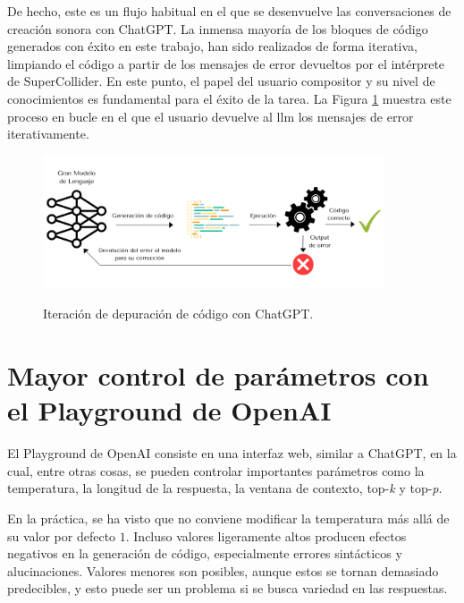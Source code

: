 De hecho, este es un flujo habitual en el que se desenvuelve las conversaciones de creación sonora con ChatGPT. La inmensa mayoría de los bloques de código generados con éxito en este trabajo, han sido realizados de forma iterativa, limpiando el código a partir de los mensajes de error devueltos por el intérprete de SuperCollider. En este punto, el papel del usuario compositor y su nivel de conocimientos es fundamental para el éxito de la tarea. La Figura \ref{fig:iteracion_depuracion} muestra este proceso en bucle en el que el usuario devuelve al \gls{llm} los mensajes de error iterativamente.

\begin{figure}[H]
    \caption[Iteración de depuración de código con ChatGPT]{Iteración de depuración de código con ChatGPT.}
    \centering
    \includegraphics[width=0.9\textwidth]{./figuras/iteracion_depuracion_codigo.png}
    \source{\propio}
    \label{fig:iteracion_depuracion}
\end{figure}

\section{Mayor control de parámetros con el Playground de OpenAI}

El Playground de OpenAI consiste en una interfaz web, similar a ChatGPT, en la cual, entre otras cosas, se pueden controlar importantes parámetros como la temperatura, la longitud de la respuesta, la ventana de contexto, top-\emph{k} y top-\emph{p}. 

En la práctica, se ha visto que no conviene modificar la temperatura más allá de su valor por defecto $1$. Incluso valores ligeramente altos producen efectos negativos en la generación de código, especialmente errores sintácticos y alucinaciones. Valores menores son posibles, aunque estos se tornan demasiado predecibles, y esto puede ser un problema si se busca variedad en las respuestas.

